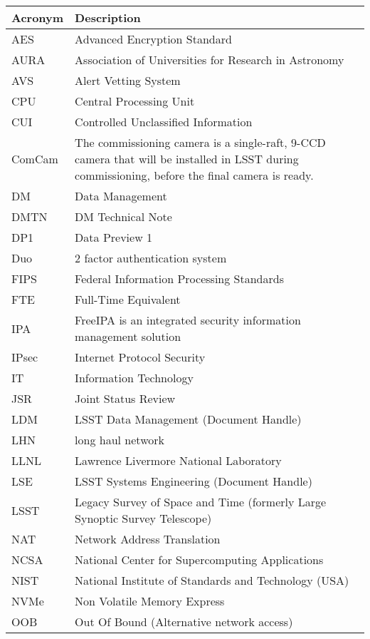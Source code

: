 \addtocounter{table}{-1}
\begin{longtable}{p{}p{}}\hline
\textbf{Acronym} & \textbf{Description}  \\\hline

AES & Advanced Encryption Standard \\\hline
AURA & Association of Universities for Research in Astronomy \\\hline
AVS & Alert Vetting System \\\hline
CPU & Central Processing Unit \\\hline
CUI & Controlled Unclassified Information \\\hline
ComCam & The commissioning camera is a single-raft, 9-CCD camera that will be installed in LSST during commissioning, before the final camera is ready. \\\hline
DM & Data Management \\\hline
DMTN & DM Technical Note \\\hline
DP1 & Data Preview 1 \\\hline
Duo & 2 factor authentication system \\\hline
FIPS & Federal Information Processing Standards \\\hline
FTE & Full-Time Equivalent \\\hline
IPA & FreeIPA is an integrated security information management solution \\\hline
IPsec & Internet Protocol Security \\\hline
IT & Information Technology \\\hline
JSR & Joint Status Review \\\hline
LDM & LSST Data Management (Document Handle) \\\hline
LHN & long haul network \\\hline
LLNL & Lawrence Livermore National Laboratory \\\hline
LSE & LSST Systems Engineering (Document Handle) \\\hline
LSST & Legacy Survey of Space and Time (formerly Large Synoptic Survey Telescope) \\\hline
NAT & Network Address Translation \\\hline
NCSA & National Center for Supercomputing Applications \\\hline
NIST & National Institute of Standards and Technology (USA) \\\hline
NVMe & Non Volatile Memory Express \\\hline
OOB & Out Of Bound (Alternative network access) \\\hline

\end{longtable}
